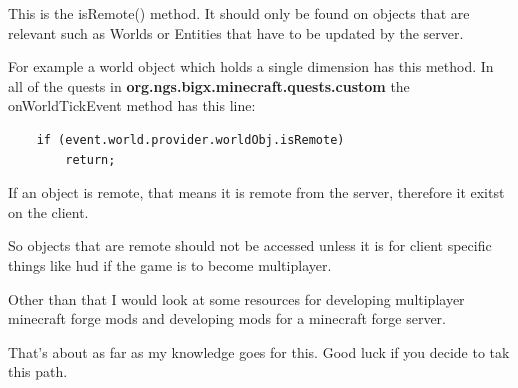 \documentclass[12pt]{article}
\begin{document}
This is the isRemote() method. It should only be found on objects that are relevant such as Worlds or Entities that have to be updated by the server.

For example a world object which holds a single dimension has this method. In all of the quests in {\bfseries org.ngs.bigx.minecraft.quests.custom} the onWorldTickEvent method has this line:

\begin{verbatim}
	if (event.world.provider.worldObj.isRemote)
		return;
\end{verbatim}

If an object is remote, that means it is remote from the server, therefore it exitst on the client.

So objects that are remote should not be accessed unless it is for client specific things like hud if the game is to become multiplayer.

Other than that I would look at some resources for developing multiplayer minecraft forge mods and developing mods for a minecraft forge server.

That's about as far as my knowledge goes for this. Good luck if you decide to tak this path.
\end{document}
